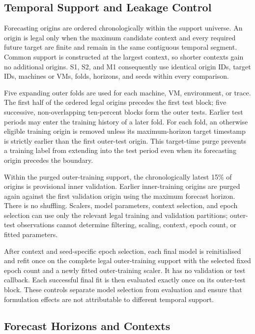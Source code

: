 \documentclass[5p,twocolumn]{elsarticle}
\begin{document}
\subsection{Temporal Support and Leakage Control}
\label{sec:leakage-control}

Forecasting origins are ordered chronologically within the support universe.
An origin is legal only when the maximum candidate context and every required
future target are finite and remain in the same contiguous temporal segment.
Common support is constructed at the largest context, so shorter contexts gain
no additional origins.  S1, S2, and M1 consequently use identical origin IDs,
target IDs, machines or VMs, folds, horizons, and seeds within every
comparison.

Five expanding outer folds are used for each machine, VM, environment, or
trace.  The first half of the ordered legal origins precedes the first test
block; five successive, non-overlapping ten-percent blocks form the outer
tests.  Earlier test periods may enter the training history of a later fold.
For each fold, an otherwise eligible training origin is removed unless its
maximum-horizon target timestamp is strictly earlier than the first outer-test
origin.  This target-time purge prevents a training label from extending into
the test period even when its forecasting origin precedes the boundary.

Within the purged outer-training support, the chronologically latest 15\% of
origins is provisional inner validation.  Earlier inner-training origins are
purged again against the first validation origin using the maximum forecast
horizon.  There is no shuffling.  Scalers, model parameters, context selection,
and epoch selection can use only the relevant legal training and validation
partitions; outer-test observations cannot determine filtering, scaling,
context, epoch count, or fitted parameters.

After context and seed-specific epoch selection, each final model is
reinitialised and refit once on the complete legal outer-training support with
the selected fixed epoch count and a newly fitted outer-training scaler.  It
has no validation or test callback.  Each successful final fit is then
evaluated exactly once on its outer-test block.  These controls separate model
selection from evaluation and ensure that formulation effects are not
attributable to different temporal support.

\subsection{Forecast Horizons and Contexts}
\label{sec:horizons-contexts}
\end{document}
